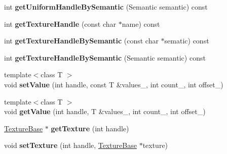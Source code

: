 \begin{DoxyCompactItemize}
\item 
int {\bfseries get\+Uniform\+Handle\+By\+Semantic} (Semantic semantic) const \hypertarget{class_magnum_1_1_visual_effect_1_1_data_a839aa5ac1ea19aad590aeb42ca08f841}{}\label{class_magnum_1_1_visual_effect_1_1_data_a839aa5ac1ea19aad590aeb42ca08f841}

\item 
int {\bfseries get\+Texture\+Handle} (const char $\ast$name) const \hypertarget{class_magnum_1_1_visual_effect_1_1_data_afce5a2fde42170cbecef2a7368a02219}{}\label{class_magnum_1_1_visual_effect_1_1_data_afce5a2fde42170cbecef2a7368a02219}

\item 
int {\bfseries get\+Texture\+Handle\+By\+Semantic} (const char $\ast$sematic) const \hypertarget{class_magnum_1_1_visual_effect_1_1_data_a5dde6c274c28eb3e65d0be3c7c0fc8df}{}\label{class_magnum_1_1_visual_effect_1_1_data_a5dde6c274c28eb3e65d0be3c7c0fc8df}

\item 
int {\bfseries get\+Texture\+Handle\+By\+Semantic} (Semantic semantic) const \hypertarget{class_magnum_1_1_visual_effect_1_1_data_a75e00fed28b04b42b6d0f8a8e6c3480f}{}\label{class_magnum_1_1_visual_effect_1_1_data_a75e00fed28b04b42b6d0f8a8e6c3480f}

\item 
{\footnotesize template$<$class T $>$ }\\void {\bfseries set\+Value} (int handle, const T \&values\+\_\+, int count\+\_, int offset\+\_)\hypertarget{class_magnum_1_1_visual_effect_1_1_data_ae4ff79f1836e096964e10f844850075c}{}\label{class_magnum_1_1_visual_effect_1_1_data_ae4ff79f1836e096964e10f844850075c}

\item 
{\footnotesize template$<$class T $>$ }\\void {\bfseries get\+Value} (int handle, T \&values\+\_\+, int count\+\_, int offset\+\_)\hypertarget{class_magnum_1_1_visual_effect_1_1_data_a4246274bd9a0c4afd85671567130049b}{}\label{class_magnum_1_1_visual_effect_1_1_data_a4246274bd9a0c4afd85671567130049b}

\item 
\hyperlink{class_magnum_1_1_texture_base}{Texture\+Base} $\ast$ {\bfseries get\+Texture} (int handle)\hypertarget{class_magnum_1_1_visual_effect_1_1_data_afd537ac76303e169ecb56e37c4121c74}{}\label{class_magnum_1_1_visual_effect_1_1_data_afd537ac76303e169ecb56e37c4121c74}

\item 
void {\bfseries set\+Texture} (int handle, \hyperlink{class_magnum_1_1_texture_base}{Texture\+Base} $\ast$texture)\hypertarget{class_magnum_1_1_visual_effect_1_1_data_a68440393046cc905eb7b36805e5eab56}{}\label{class_magnum_1_1_visual_effect_1_1_data_a68440393046cc905eb7b36805e5eab56}


\end{DoxyCompactItemize}
